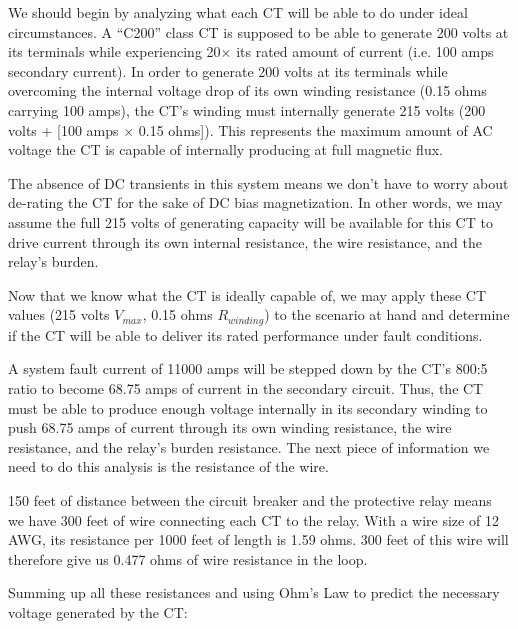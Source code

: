





We should begin by analyzing what each CT will be able to do under ideal circumstances.  A ``C200'' class CT is supposed to be able to generate 200 volts at its terminals while experiencing 20$\times$ its rated amount of current (i.e. 100 amps secondary current).  In order to generate 200 volts at its terminals while overcoming the internal voltage drop of its own winding resistance (0.15 ohms carrying 100 amps), the CT's winding must internally generate 215 volts (200 volts + [100 amps $\times$ 0.15 ohms]).  This represents the maximum amount of AC voltage the CT is capable of internally producing at full magnetic flux.

The absence of DC transients in this system means we don't have to worry about de-rating the CT for the sake of DC bias magnetization.  In other words, we may assume the full 215 volts of generating capacity will be available for this CT to drive current through its own internal resistance, the wire resistance, and the relay's burden.

\vskip 10pt

Now that we know what the CT is ideally capable of, we may apply these CT values (215 volts $V_{max}$, 0.15 ohms $R_{winding}$) to the scenario at hand and determine if the CT will be able to deliver its rated performance under fault conditions.

\vskip 10pt

A system fault current of 11000 amps will be stepped down by the CT's 800:5 ratio to become 68.75 amps of current in the secondary circuit.  Thus, the CT must be able to produce enough voltage internally in its secondary winding to push 68.75 amps of current through its own winding resistance, the wire resistance, and the relay's burden resistance.  The next piece of information we need to do this analysis is the resistance of the wire.

150 feet of distance between the circuit breaker and the protective relay means we have 300 feet of wire connecting each CT to the relay.  With a wire size of 12 AWG, its resistance per 1000 feet of length is 1.59 ohms.  300 feet of this wire will therefore give us 0.477 ohms of wire resistance in the loop.

Summing up all these resistances and using Ohm's Law to predict the necessary voltage generated by the CT:

